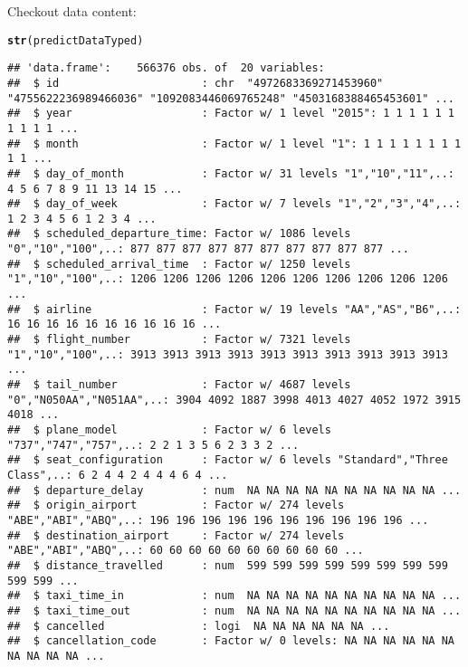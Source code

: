 \documentclass{article}\usepackage[]{graphicx}\usepackage[]{color}
\makeatletter
\newcommand{\hlstd}[1]{\textcolor[rgb]{0.345,0.345,0.345}{#1}}%
\newcommand{\hlkwd}[1]{\textcolor[rgb]{0.737,0.353,0.396}{\textbf{#1}}}%
\newenvironment{kframe}{%
 \def\at@end@of@kframe{}%
 \ifinner\ifhmode%
  \def\at@end@of@kframe{\end{minipage}}%
  \begin{minipage}{\columnwidth}%
 \fi\fi%
 \def\FrameCommand##1{\hskip\@totalleftmargin \hskip-\fboxsep
 \colorbox{shadecolor}{##1}\hskip-\fboxsep
     \hskip-\linewidth \hskip-\@totalleftmargin \hskip\columnwidth}%
 \MakeFramed {\advance\hsize-\width
   \@totalleftmargin\z@ \linewidth\hsize
   \@setminipage}}%
 {\par\unskip\endMakeFramed%
 \at@end@of@kframe}
\newenvironment{knitrout}{}{} %
\makeatother
\begin{document}
Checkout data content:
\begin{knitrout}
\color{fgcolor}\begin{kframe}
\begin{alltt}
\hlkwd{str}\hlstd{(predictDataTyped)}
\end{alltt}
\begin{verbatim}
## 'data.frame':	566376 obs. of  20 variables:
##  $ id                      : chr  "4972683369271453960" "4755622236989466036" "1092083446069765248" "4503168388465453601" ...
##  $ year                    : Factor w/ 1 level "2015": 1 1 1 1 1 1 1 1 1 1 ...
##  $ month                   : Factor w/ 1 level "1": 1 1 1 1 1 1 1 1 1 1 ...
##  $ day_of_month            : Factor w/ 31 levels "1","10","11",..: 4 5 6 7 8 9 11 13 14 15 ...
##  $ day_of_week             : Factor w/ 7 levels "1","2","3","4",..: 1 2 3 4 5 6 1 2 3 4 ...
##  $ scheduled_departure_time: Factor w/ 1086 levels "0","10","100",..: 877 877 877 877 877 877 877 877 877 877 ...
##  $ scheduled_arrival_time  : Factor w/ 1250 levels "1","10","100",..: 1206 1206 1206 1206 1206 1206 1206 1206 1206 1206 ...
##  $ airline                 : Factor w/ 19 levels "AA","AS","B6",..: 16 16 16 16 16 16 16 16 16 16 ...
##  $ flight_number           : Factor w/ 7321 levels "1","10","100",..: 3913 3913 3913 3913 3913 3913 3913 3913 3913 3913 ...
##  $ tail_number             : Factor w/ 4687 levels "0","N050AA","N051AA",..: 3904 4092 1887 3998 4013 4027 4052 1972 3915 4018 ...
##  $ plane_model             : Factor w/ 6 levels "737","747","757",..: 2 2 1 3 5 6 2 3 3 2 ...
##  $ seat_configuration      : Factor w/ 6 levels "Standard","Three Class",..: 6 2 4 4 2 4 4 4 6 4 ...
##  $ departure_delay         : num  NA NA NA NA NA NA NA NA NA NA ...
##  $ origin_airport          : Factor w/ 274 levels "ABE","ABI","ABQ",..: 196 196 196 196 196 196 196 196 196 196 ...
##  $ destination_airport     : Factor w/ 274 levels "ABE","ABI","ABQ",..: 60 60 60 60 60 60 60 60 60 60 ...
##  $ distance_travelled      : num  599 599 599 599 599 599 599 599 599 599 ...
##  $ taxi_time_in            : num  NA NA NA NA NA NA NA NA NA NA ...
##  $ taxi_time_out           : num  NA NA NA NA NA NA NA NA NA NA ...
##  $ cancelled               : logi  NA NA NA NA NA NA ...
##  $ cancellation_code       : Factor w/ 0 levels: NA NA NA NA NA NA NA NA NA NA ...
\end{verbatim}
\end{kframe}
\end{knitrout}
\end{document}
